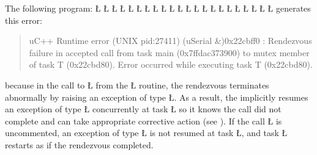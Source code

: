 \documentclass[openright,twoside]{report}
\begin{document}
The following program:
\LGinlinefalse\LGbegin\lgrinde
\L{}
\L{\LB{}}
\L{}
\L{\LB{}}
\L{}
\L{\LB{}}
\L{\LB{}}
\L{\LB{\C{}\1\1}}
\CE{}\L{\LB{}}
\L{\LB{}}
\L{}
\L{\LB{}}
\L{\LB{}}
\L{\LB{}}
\L{\LB{\};}}
\endlgrinde\LGend
\LGinlinefalse\LGbegin\lgrinde
\L{}
\L{\LB{}}
\L{\LB{}}
\L{\LB{}}
\L{\LB{}}
\L{\LB{}}
\L{\LB{\}}}
\endlgrinde\LGend
generates this error:
\begin{quote}
\BGfont
uC++ Runtime error (UNIX pid:27411) (uSerial \&)0x22cbff0 : Rendezvous failure in accepted call from task main (0x7ffdac373900) to mutex member of task T (0x22cbd80).
Error occurred while executing task T (0x22cbd80).
\end{quote}
because in the call to \LGinlinetrue\LGbegin\lgrinde\L{}\endlgrinde\LGend{} from the \LGinlinetrue\LGbegin\lgrinde\L{}\endlgrinde\LGend{} routine, the rendezvous terminates abnormally by raising an exception of type \LGinlinetrue\LGbegin\lgrinde\L{}\endlgrinde\LGend{}.
As a result, the  implicitly resumes an exception of type \LGinlinetrue\LGbegin\lgrinde\L{}\endlgrinde\LGend{} concurrently at task \LGinlinetrue\LGbegin\lgrinde\L{}\endlgrinde\LGend{} so it knows the call did not complete and can take appropriate corrective action (see ).
If the call \LGinlinetrue\LGbegin\lgrinde\L{}\endlgrinde\LGend{} is uncommented, an exception of type \LGinlinetrue\LGbegin\lgrinde\L{}\endlgrinde\LGend{} is not resumed at task \LGinlinetrue\LGbegin\lgrinde\L{}\endlgrinde\LGend{}, and task \LGinlinetrue\LGbegin\lgrinde\L{}\endlgrinde\LGend{} restarts as if the rendezvous completed.
\end{document}
